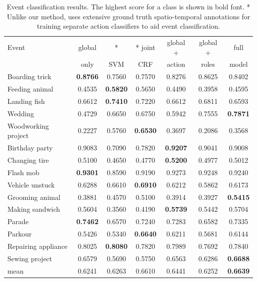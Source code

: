 \documentclass[10pt,twocolumn,letterpaper]{article}
\begin{document}
\setlength{\tabcolsep}{2.5pt}
\begin{table}
\begin{center}
\scalebox{0.9}
{\footnotesize
\begin{tabular}{|l|c|c|c|c|c|c|}
\hline
{Event} & global & \cite{Izadinia_ECCV12} {\color{red}*} & \cite{Izadinia_ECCV12} {\color{red}*} joint & global +  & global + & full \\
& only & SVM & CRF & action & roles & model \\
  \hline \hline
Boarding trick & \textbf{0.8766} & 0.7560 & 0.7570 & 0.8276 & 0.8625 & 0.8402 \\ 
Feeding animal & 0.4535 & \textbf{0.5820} & 0.5650 & 0.4490 & 0.3958 & 0.4595 \\ 
Landing fish & 0.6612 & \textbf{0.7410} & 0.7220 & 0.6612 & 0.6811 & 0.6593 \\ 
Wedding & 0.4729 & 0.6650 & 0.6750 & 0.5942 & 0.7555 & \textbf{0.7871} \\ 
Woodworking project & 0.2227 & 0.5760 & \textbf{0.6530} & 0.3697 & 0.2086 & 0.3568 \\ 
Birthday party & 0.9083 & 0.7090 & 0.7820 & \textbf{0.9207} & 0.9041 & 0.9008 \\ 
Changing tire & 0.5100 & 0.4650 & 0.4770 & \textbf{0.5200} & 0.4977 & 0.5012 \\ 
Flash mob & \textbf{0.9301} & 0.8590 & 0.9190 & 0.9273 & 0.9248 & 0.9240 \\ 
Vehicle unstuck & 0.6288 & 0.6610 & \textbf{0.6910} & 0.6212 & 0.5862 & 0.6173 \\ 
Grooming animal & 0.3881 & 0.4570 & 0.5100 & 0.3914 & 0.3927 & \textbf{0.5415} \\ 
Making sandwich & 0.5604 & 0.3560 & 0.4190 & \textbf{0.5739} & 0.5442 & 0.5704 \\ 
Parade & \textbf{0.7462} & 0.6570 & 0.7240 & 0.7283 & 0.6582 & 0.7335 \\ 
Parkour & 0.5426 & 0.5340 & \textbf{0.6640} & 0.6211 & 0.5681 & 0.6144 \\ 
Repairing appliance & 0.8025 & \textbf{0.8080} & 0.7820 & 0.7989 & 0.7692 & 0.7840 \\ 
Sewing project & 0.6579 & 0.5690 & 0.5750 & 0.6563 & 0.6286 & \textbf{0.6688} \\ 
\hline \hline
mean & 0.6241 & 0.6263 & 0.6610 & 0.6441 & 0.6252 & \textbf{0.6639} \\
\hline
\end{tabular}
}
\end{center}
\caption{Event classification results. The highest score for a class is shown in bold font. {\color{red}*} Unlike our method, \cite{Izadinia_ECCV12} uses extensive ground truth spatio-temporal annotations for training separate action classifiers to aid event classification.}
\label{tab:results_event}
\end{table}
\setlength{\tabcolsep}{1.4pt}
\end{document}
